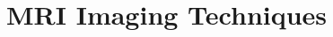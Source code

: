 \acresetall
\chapter{MRI Imaging Techniques}\label{chap:2}

\ifpdf
    \graphicspath{{2_modality/figures/}}
\else
    \graphicspath{{2_modality/figures/}}
\fi


%

